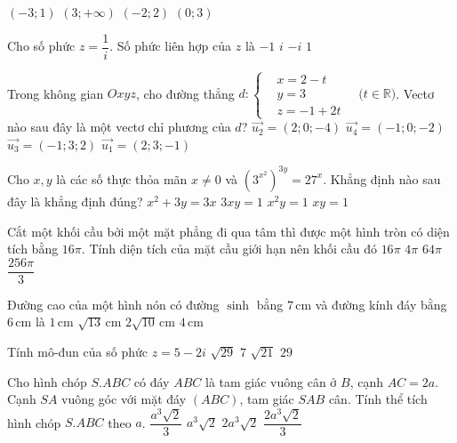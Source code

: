 \begin{ex}%
{
}
\choice
{$(-3; 1)$}
{$(3;+\infty)$}
{$(-2; 2)$}
{\True $(0; 3)$}
\end{ex}
\begin{ex}%
Cho số phức $z=\dfrac{1}{i}$. Số phức liên hợp của $z$ là
\choice
{$-1$}
{\True $i$}
{$-i$}
{$1$}

\end{ex}
\begin{ex}%
Trong không gian $O x y z$, cho đường thẳng $d\colon\left\{\begin{aligned}&x=2-t \\& y=3\\& z=-1+2 t\end{aligned} \quad(t \in\right. \mathbb{R})$. Vectơ nào sau đây là một vectơ chỉ phương của $d$?
\choice
{\True $\overrightarrow{u_2}=(2; 0;-4)$}
{$\overrightarrow{u_4}=(-1; 0;-2)$}
{$\overrightarrow{u_3}=(-1; 3; 2)$}
{$\overrightarrow{u_1}=(2; 3;-1)$}

\end{ex}
\begin{ex}%
Cho $x, y$ là các số thực thỏa mãn $x \neq 0$ và $\left(3^{x^2}\right)^{3 y}=27^{x}$. Khẳng định nào sau đây là khẳng định đúng?
\choice
{$x^2+3 y=3 x$}
{$3 x y=1$}
{$x^2 y=1$}
{\True $x y=1$}

\end{ex}
\begin{ex}%
Cắt một khối cầu bởi một mặt phẳng đi qua tâm thì được một hình tròn có diện tích bằng $16\pi$. Tính diện tích của mặt cầu giới hạn nên khối cầu đó
\choice
{$16\pi$}
{$4\pi$}
{\True $64\pi$}
{$\dfrac{256\pi}{3}$}

\end{ex}
\begin{ex}%
Đường cao của một hình nón có đường $\sinh$ bằng $7\mathrm{\,cm}$ và đường kính đáy bằng $6\mathrm{\,cm}$ là
\choice
{$1\mathrm{\,cm}$}
{$\sqrt{13} \mathrm{\,cm}$}
{\True $2\sqrt{10} \mathrm{\,cm}$}
{$4\mathrm{\,cm}$}

\end{ex}
\begin{ex}%
Tính mô-đun của số phức $z=5-2 i$ 
\choice
{\True $\sqrt{29}$}
{$7$}
{$\sqrt{21}$}
{$29$}

\end{ex}
\begin{ex}%
Cho hình chóp $S.ABC$ có đáy $ABC$ là tam giác vuông cân ở $B$, cạnh $AC=2 a$. Cạnh $SA$ vuông góc với mặt đáy $(ABC)$, tam giác $SAB$ cân. Tính thể tích hình chóp $S.ABC$ theo $a$.
\choice
{\True $\dfrac{a^3 \sqrt{2}}{3}$}
{$a^3 \sqrt{2}$}
{$2 a^3 \sqrt{2}$}
{$\dfrac{2 a^3 \sqrt{2}}{3}$}

\end{ex}

